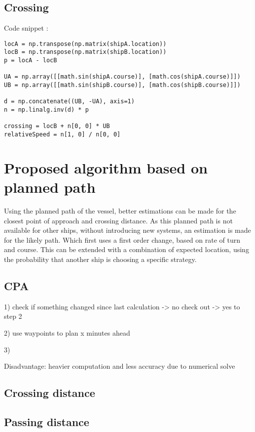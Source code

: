 \subsection{Crossing}
Code snippet :
\begin{lstlisting}
locA = np.transpose(np.matrix(shipA.location))
locB = np.transpose(np.matrix(shipB.location))
p = locA - locB

UA = np.array([[math.sin(shipA.course)], [math.cos(shipA.course)]])
UB = np.array([[math.sin(shipB.course)], [math.cos(shipB.course)]])

d = np.concatenate((UB, -UA), axis=1)
n = np.linalg.inv(d) * p

crossing = locB + n[0, 0] * UB
relativeSpeed = n[1, 0] / n[0, 0]
\end{lstlisting}

\section{Proposed algorithm based on planned path}
Using the planned path of the vessel, better estimations can be made for the closest point of approach and crossing distance. As this planned path is not available for other ships, without introducing new systems, an estimation is made for the likely path. Which first uses a first order change, based on rate of turn and course. This can be extended with a combination of expected location, using the probability that another ship is choosing a specific strategy.

\subsection{CPA}
1) check if something changed since last calculation
-> no check out
-> yes to step 2

2) use waypoints to plan x minutes ahead

3) 





Disadvantage: heavier computation and less accuracy due to numerical solve

\subsection{Crossing distance}

\subsection{Passing distance}


